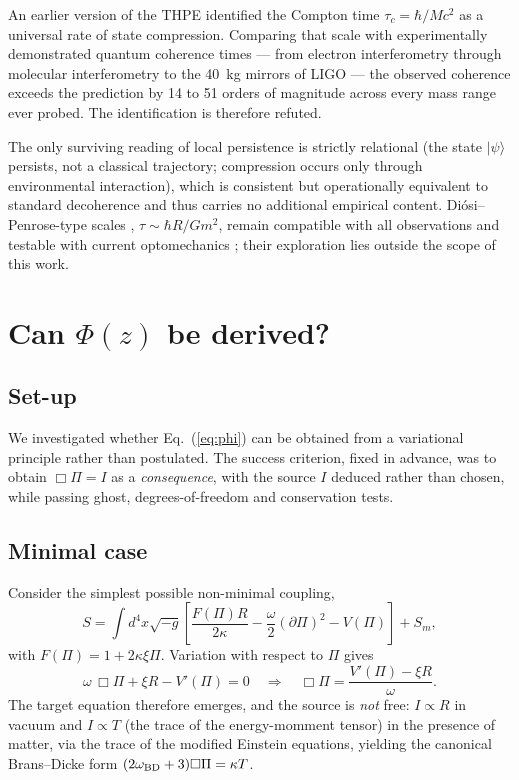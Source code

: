 \documentclass[aps,prd,twocolumn,superscriptaddress,nofootinbib,floatfix]{revtex4-2}
\begin{document}
An earlier version of the THPE identified the Compton time
$\tau_c=\hbar/Mc^2$ as a universal rate of state compression. Comparing
that scale with experimentally demonstrated quantum coherence times ---
from electron interferometry through molecular interferometry
\cite{Fein2019} to the 40~kg mirrors of LIGO --- the observed coherence
exceeds the prediction by 14 to 51 orders of magnitude across every mass
range ever probed. The identification is therefore refuted.

The only surviving reading of local persistence is strictly relational
(the state $|\psi\rangle$ persists, not a classical trajectory;
compression occurs only through environmental interaction), which is
consistent but operationally equivalent to standard decoherence and thus
carries no additional empirical content. Di\'osi--Penrose-type scales
\cite{Diosi1987,Penrose1996}, $\tau\sim\hbar R/Gm^2$, remain compatible
with all observations and testable with current optomechanics
\cite{Donadi2021}; their exploration lies outside the scope of this
work.

\section{Can $\Phi(z)$ be derived?}
\label{sec:derivation}

\subsection{Set-up}

We investigated whether Eq.~(\ref{eq:phi}) can be obtained from a
variational principle rather than postulated. The success criterion,
fixed in advance, was to obtain $\Box\Pi=I$ as a \emph{consequence},
with the source $I$ deduced rather than chosen, while passing ghost,
degrees-of-freedom and conservation tests.

\subsection{Minimal case}

Consider the simplest possible non-minimal coupling,
%
\begin{equation}
S=\int d^4x\sqrt{-g}\left[\frac{F(\Pi)R}{2\kappa}
-\frac{\omega}{2}(\partial\Pi)^2-V(\Pi)\right]+S_m,
\label{eq:action}
\end{equation}
%
with $F(\Pi)=1+2\kappa\xi\Pi$. Variation with respect to $\Pi$ gives
%
\begin{equation}
\omega\,\Box\Pi+\xi R-V'(\Pi)=0
\quad\Longrightarrow\quad
\Box\Pi=\frac{V'(\Pi)-\xi R}{\omega}.
\label{eq:boxpi}
\end{equation}
%
The target equation therefore emerges, and the source is \emph{not}
free: $I\propto R$ in vacuum and $I\propto T$ (the trace of the
energy-momment tensor) in the presence of matter, via the trace of the
modified Einstein equations, yielding the canonical Brans--Dicke form
$(2\omega_{\rm BD}+3)\Box\Pi=\kappa T$.
\end{document}
